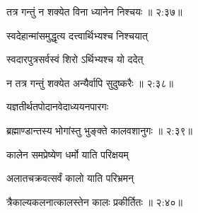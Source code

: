 
{\devanagarifont तत्र गन्तुं न शक्येत विना ध्यानेन निश्चयः {॥ २:३७॥} \veg\dontdisplaylinenum }%

{\devanagarifont स्वदेहान्मांसमुद्धृत्य दत्त्वार्थिभ्यश्च निश्चयात् \thinspace{\dandab} \dontdisplaylinenum }%

{\devanagarifont स्वदारपुत्रसर्वस्वं शिरो ऽर्थिभ्यश्च यो ददेत्  \danda\dontdisplaylinenum }%


{\devanagarifont न तत्र गन्तुं शक्येत अन्यैर्वापि सुदुष्करैः {॥ २:३८॥} \veg\dontdisplaylinenum }%

{\devanagarifont यज्ञतीर्थतपोदानवेदाध्ययनपारगः \thinspace{\dandab} \dontdisplaylinenum }%


{\devanagarifont ब्रह्माण्डान्तस्य भोगांस्तु भुङ्क्ते कालवशानुगः {॥ २:३९॥} \veg\dontdisplaylinenum }%

{\devanagarifont कालेन समप्रेष्येण धर्मो याति परिक्षयम् \thinspace{\dandab} \dontdisplaylinenum }%

{\devanagarifont अलातचक्रवत्सर्वं कालो याति परिभ्रमन्  \danda\dontdisplaylinenum }%
 

{\devanagarifont त्रैकाल्यकलनात्कालस्तेन कालः प्रकीर्तितः {॥ २:४०॥} \veg\dontdisplaylinenum }%

